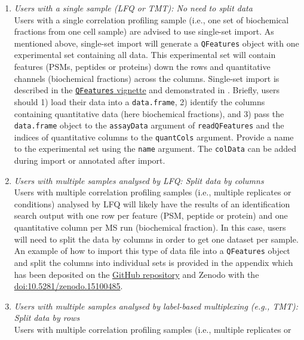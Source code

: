 \documentclass[9pt,a4paper,]{extarticle}
\begin{document}
\begin{enumerate}
\def\labelenumi{(\Alph{enumi})}
\item
  \emph{Users with a single sample (LFQ or TMT): No need to split data}\\
  Users with a single correlation profiling sample (i.e., one set of biochemical
  fractions from one cell sample) are advised to use single-set import.
  As mentioned above, single-set import will generate a \texttt{QFeatures}
  object with one experimental set containing all data. This experimental set will
  contain features (PSMs, peptides or proteins) down the rows and quantitative
  channels (biochemical fractions) across the columns. Single-set import is
  described in the \href{https://www.bioconductor.org/packages/release/bioc/vignettes/QFeatures/inst/doc/read_QFeatures.html}{\texttt{QFeatures} vignette}
  and demonstrated in \citet{Hutchings2023}. Briefly, users should 1) load their data
  into a \texttt{data.frame}, 2) identify the columns containing quantitative data
  (here biochemical fractions), and 3) pass the \texttt{data.frame} object to the
  \texttt{assayData} argument of \texttt{readQFeatures} and the indices of quantitative columns
  to the \texttt{quantCols} argument. Provide a name to the experimental set using the
  \texttt{name} argument. The \texttt{colData} can be added during import or annotated after import.
\item
  \emph{Users with multiple samples analysed by LFQ: Split data by columns}\\
  Users with multiple correlation profiling samples (i.e., multiple replicates or
  conditions) analysed by LFQ will likely have the results of an identification
  search output with one row per feature (PSM, peptide or protein) and one quantitative
  column per MS run (biochemical fraction). In this case, users will need to split
  the data by columns in order to get one dataset per sample. An example of
  how to import this type of data file into a \texttt{QFeatures} object and split the
  columns into individual sets is provided in the appendix which
  has been deposited on the \href{https://github.com/CambridgeCentreForProteomics/f1000_subcellular_proteomics}{GitHub repository}
  and Zenodo with the \href{http://doi.org/10.5281/zenodo.15100485}{doi:10.5281/zenodo.15100485}.
\item
  \emph{Users with multiple samples analysed by label-based multiplexing (e.g., TMT): Split data by rows}\\
  Users with multiple correlation profiling samples (i.e., multiple replicates or

\end{enumerate}
\end{document}
